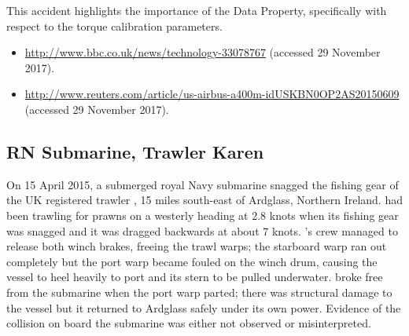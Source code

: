 This accident highlights the importance of the  Data Property, specifically with respect to the torque calibration parameters.

\begin{samepage}
\begin{itemize}
  \item \raggedright{\href{http://www.bbc.co.uk/news/technology-33078767}{http://www.bbc.co.uk/news/technology-33078767} (accessed 29 November 2017).}
  \item \raggedright{\href{http://www.reuters.com/article/us-airbus-a400m-idUSKBN0OP2AS20150609}{http://www.reuters.com/article/us-airbus-a400m-idUSKBN0OP2AS20150609} (accessed 29 November 2017).}
\end{itemize}
\end{samepage}


\subsection{RN Submarine, Trawler Karen} \label{bkm:incacc:subtrawler}
On 15 April 2015, a submerged royal Navy submarine snagged the fishing gear of the UK registered trawler , 15 miles south-east of Ardglass, Northern Ireland.  had been trawling for prawns on a westerly heading at 2.8 knots when its fishing gear was snagged and it was dragged backwards at about 7 knots. 's crew managed to release both winch brakes, freeing the trawl warps; the starboard warp ran out completely but the port warp became fouled on the winch drum, causing the vessel to heel heavily to port and its stern to be pulled underwater.  broke free from the submarine when the port warp parted; there was structural damage to the vessel but it returned to Ardglass safely under its own power. Evidence of the collision on board the submarine was either not observed or misinterpreted. 

